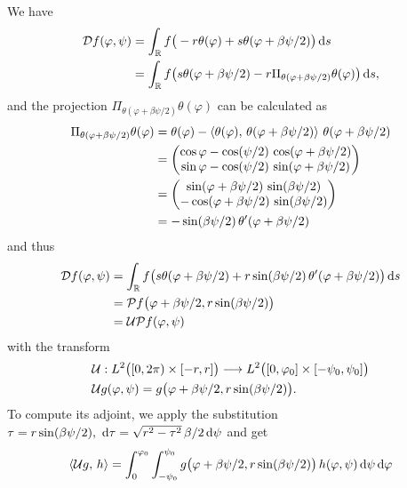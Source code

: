 \documentclass{amsart}
\renewcommand*{\phi}{\varphi}
\begin{document}
\begin{example}
 We have
 \begin{align*}
  \OPD f(\phi, \psi) 
  &= \int_\RR f\big(- r\theta(\phi) + s \theta(\phi + \beta\psi/2)\big)\, \D s \\
  &= \int_\RR f\big(s \theta(\phi + \beta\psi/2) - r \Pi_{\theta(\phi + \beta\psi/2)}\theta(\phi) \big)\, \D s,
 \end{align*}
 and the projection $\Pi_{\theta(\phi + \beta\psi/2)}\theta(\phi)$ can be calculated as
 \begin{align*}
  \Pi_{\theta(\phi + \beta\psi/2)}\theta(\phi)
  &= \theta(\phi) - \INNERLR{\theta(\phi)}{\theta(\phi + \beta\psi/2)}\, \theta(\phi + \beta\psi/2) \\
  &=
  \begin{pmatrix}
   \cos\phi - \cos(\psi/2)\, \cos(\phi + \beta\psi/2) \\
   \sin\phi - \cos(\psi/2)\, \sin(\phi + \beta\psi/2)
  \end{pmatrix} \\
  &=
  \begin{pmatrix}
   \sin(\phi + \beta\psi/2)\, \sin(\beta\psi/2) \\
   -\cos(\phi + \beta\psi/2)\, \sin(\beta\psi/2)
  \end{pmatrix} \\
  &= -\sin(\beta\psi/2)\, \theta'(\phi + \beta\psi/2)
 \end{align*}
 and thus 
 \begin{align*}
  \OPD f(\phi, \psi)
  &= \int_\RR f\big(s \theta(\phi + \beta\psi/2) + r \sin(\beta\psi/2)\, \theta'(\phi + \beta\psi/2) \big)\, \D s \\
  &= \OPP f\big(\phi + \beta\psi/2, r\sin(\beta\psi/2)\big) \\
  &= \OPU \OPP f(\phi, \psi)
 \end{align*}
 with the transform
 \begin{align}
  &\OPU: L^2\big([0,2\pi) \times [-r,r]\big) \Lto L^2\big([0,\phi_0] \times [-\psi_0,\psi_0]\big) \notag \\
  \label{eq:fanbeam_unit_trafo}
  &\OPU g(\phi, \psi) = g\big(\phi + \beta\psi/2, r\sin(\beta\psi/2)\big).
 \end{align} 
 To compute its adjoint, we apply the substitution $\tau = r\sin(\beta\psi/2),\ \mathrm{d}\tau = \sqrt{r^2-\tau^2}\, \beta/2\, \mathrm{d} \psi$ and get
 \begin{align*}
  \INNER{\OPU g}{h} 
  &= \int_0^{\phi_0} \int_{-\psi_0}^{\psi_0} g\big(\phi + \beta\psi/2, r\sin(\beta\psi/2)\big)\, h(\phi, \psi)\, \D\psi\, \D\phi \\

\end{align*}
\end{example}
\end{document}

